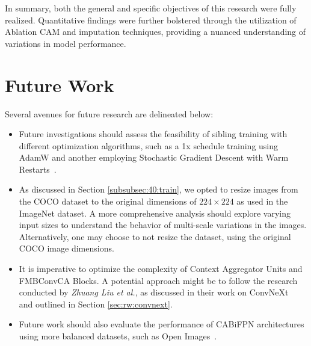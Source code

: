 In summary, both the general and specific objectives of this research were fully realized. Quantitative findings were further bolstered through the utilization of Ablation CAM and imputation techniques, providing a nuanced understanding of variations in model performance.

\section{Future Work}
Several avenues for future research are delineated below:
\begin{itemize}
    \item Future investigations should assess the feasibility of sibling training with different optimization algorithms, such as a 1x schedule training using AdamW and another employing Stochastic Gradient Descent with Warm Restarts~\cite{DBLP:journals/corr/LoshchilovH16a}.
    \item As discussed in Section \ref{subsubsec:40:train}, we opted to resize images from the COCO dataset to the original dimensions of $224 \times 224$ as used in the ImageNet dataset. A more comprehensive analysis should explore varying input sizes to understand the behavior of multi-scale variations in the images. Alternatively, one may choose to not resize the dataset, using the original COCO image dimensions.
    \item It is imperative to optimize the complexity of Context Aggregator Units and FMBConvCA Blocks. A potential approach might be to follow the research conducted by \textit{Zhuang Liu et al.}, as discussed in their work on ConvNeXt~\cite{liu2022convnet} and outlined in Section \ref{sec:rw:convnext}.
    \item Future work should also evaluate the performance of CABiFPN architectures using more balanced datasets, such as Open Images~\cite{OpenImages2}.
\end{itemize}